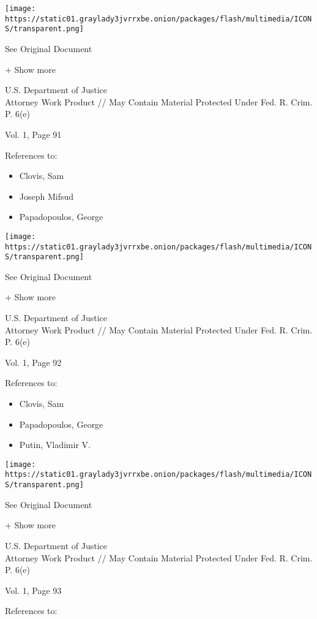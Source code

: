 \protect\hyperlink{}{}

\texttt{[image: https://static01.graylady3jvrrxbe.onion/packages/flash/multimedia/ICONS/transparent.png]}

See Original Document

+ Show more

U.S. Department of Justice\\
Attorney Work Product // May Contain Material Protected Under Fed. R.
Crim. P. 6(e)

Vol. 1, Page 91

References to:

\begin{itemize}
\tightlist
\item
  Clovis, Sam
\item
  Joseph Mifsud
\item
  Papadopoulos, George
\end{itemize}

\protect\hyperlink{}{}

\texttt{[image: https://static01.graylady3jvrrxbe.onion/packages/flash/multimedia/ICONS/transparent.png]}

See Original Document

+ Show more

U.S. Department of Justice\\
Attorney Work Product // May Contain Material Protected Under Fed. R.
Crim. P. 6(e)

Vol. 1, Page 92

References to:

\begin{itemize}
\tightlist
\item
  Clovis, Sam
\item
  Papadopoulos, George
\item
  Putin, Vladimir V.
\end{itemize}

\protect\hyperlink{}{}

\texttt{[image: https://static01.graylady3jvrrxbe.onion/packages/flash/multimedia/ICONS/transparent.png]}

See Original Document

+ Show more

U.S. Department of Justice\\
Attorney Work Product // May Contain Material Protected Under Fed. R.
Crim. P. 6(e)

Vol. 1, Page 93

References to:

